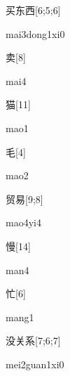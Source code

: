 \begin{verbete}{买东西}[6;5;6]
\begin{pronuncia}{mai3dong1xi0}
\end{pronuncia}
\end{verbete}

\begin{verbete}[mai4]{卖}[8]
\begin{pronuncia}{mai4}
\end{pronuncia}
\end{verbete}

\begin{verbete}[mao1]{猫}[11]
\begin{pronuncia}{mao1}
\end{pronuncia}
\end{verbete}

\begin{verbete}[mao2]{毛}[4]
\begin{pronuncia}{mao2}
\end{pronuncia}
\end{verbete}

\begin{verbete}[mao4yi4]{贸易}[9;8]
\begin{pronuncia}{mao4yi4}
\end{pronuncia}
\end{verbete}

\begin{verbete}[man4]{慢}[14]
\begin{pronuncia}{man4}
\end{pronuncia}
\end{verbete}

\begin{verbete}[mang1]{忙}[6]
\begin{pronuncia}{mang1}
\end{pronuncia}
\end{verbete}

\begin{verbete}{没关系}[7;6;7]
\begin{pronuncia}{mei2guan1xi0}
\end{pronuncia}
\end{verbete}

